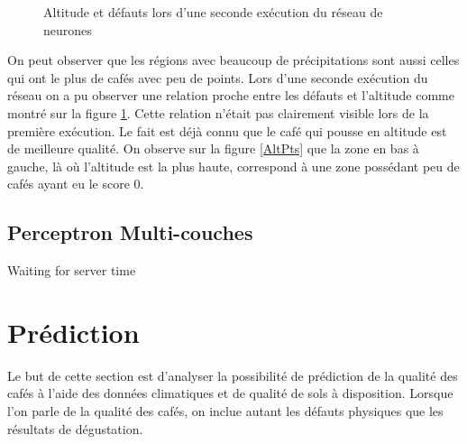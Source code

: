 \begin{figure}[H]
	\caption{\label{SecondSOMASNM}Altitude et défauts lors d'une seconde exécution du réseau de neurones}
	\centering
	\hfill
	\newline

	\centering
	\hfill
	\hfill
	\newline
	\centering 
\end{figure}

On peut observer que les régions avec beaucoup de précipitations sont aussi celles qui ont le plus de cafés avec peu de points. Lors d'une seconde exécution du réseau on a pu observer une relation proche entre les défauts et l'altitude comme montré sur la figure \ref{SecondSOMASNM}. Cette relation n'était pas clairement visible lors de la première exécution. Le fait est déjà connu que le café qui pousse en altitude est de meilleure qualité. On observe sur la figure \ref{AltPts} que la zone en bas à gauche, là où l'altitude est la plus haute, correspond à une zone possédant peu de cafés ayant eu le score 0. 

\newpage
\subsection{Perceptron Multi-couches}
Waiting for server time



\section{Prédiction}
Le but de cette section est d'analyser la possibilité de prédiction de la qualité des cafés à l'aide des données climatiques et de qualité de sols à disposition. Lorsque l'on parle de la qualité des cafés, on inclue autant les défauts physiques que les résultats de dégustation. 

